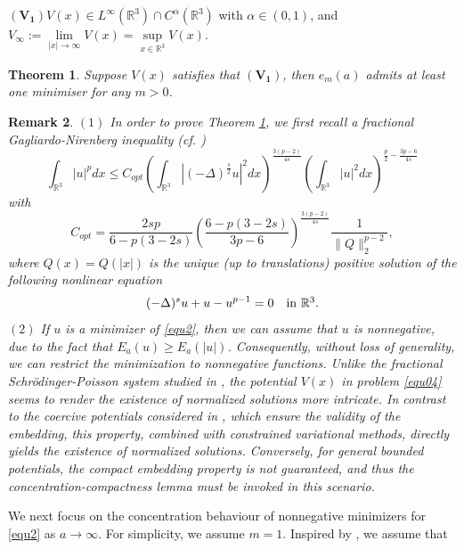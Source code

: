 \documentclass[reqno, 11pt]{amsart} %
\numberwithin{equation}{section}
\newtheorem{theorem}{Theorem}[section]
\newtheorem{remark}[theorem]{Remark}
\begin{document}
$\mathbf{(V_1)}$\quad $V(x)\in L^{\infty}(\mathbb{R}^{3})\cap C^{\alpha}(\mathbb{R}^{3})$ with $\alpha\in (0, 1)$, and $V_{\infty}:=\lim\limits_{|x|\rightarrow\infty}V(x)=\sup\limits_{x \in \mathbb{R}^3}V(x)$.
	\begin{theorem}\label{the1}
		Suppose $V(x)$ satisfies that $\mathbf{(V_1)}$,
	then $e_{m}(a)$ admits at least one minimiser for any $m>0$.
	\end{theorem}
	\begin{remark}
	\rm $(1)$ In order to prove Theorem \ref{the1}, we first recall a fractional Gagliardo-Nirenberg inequality (cf. \cite[Lemma 2.1]{H})
	\begin{equation}\label{equ4}
		\int_{\mathbb{R}^{3}}|u|^{p}dx\leq C_{opt}\left(\int_{\mathbb{R}^{3}}|(-\Delta)^{\frac{s}{2}} u|^{2}dx\right)^{\frac{3(p-2)}{4s}}\left(\int_{\mathbb{R}^{3}}|u|^{2}dx\right)^{\frac{p}{2}-\frac{3p-6}{4s}}
	\end{equation}
	with
	\begin{equation*}
		C_{opt}=\frac{2sp}{6-p(3-2s)}\left( \frac{6-p(3-2s)}{3p-6}\right)^{\frac{3(p-2)}{4s}} \frac{1}{\|Q\|_{2}^{p-2}},
	\end{equation*}
	where $Q(x)=Q(|x|)$ is the unique (up to translations) positive solution of the following nonlinear equation
	\begin{equation}\label{equ5}
		(-\Delta)^{s}u+u-u^{p-1}=0 \quad \hbox{in $\mathbb{R}^3$}.
	\end{equation}	
	$(2)$ If $u$ is a minimizer of \eqref{equ2}, then we can assume that $u$ is nonnegative, due to the fact that $E_{a}(u)\geq E_{a}(|u|)$. Consequently, without loss of generality, we can restrict the minimization to nonnegative functions. Unlike the fractional Schr\"{o}dinger-Poisson system studied in \cite{MHCV}, the potential $V(x)$ in problem \eqref{equ04} seems to render the existence of normalized solutions more intricate. In contrast to the coercive potentials considered in \cite{D,GLMP,GSIM,H}, which ensure the validity of the embedding, this property, combined with constrained variational methods, directly yields the existence of normalized solutions. Conversely, for general bounded potentials, the compact embedding property is not guaranteed, and thus the concentration-compactness lemma must be invoked in this scenario.
\end{remark}
	
	We next focus on the concentration behaviour of nonnegative
	minimizers for \eqref{equ2} as $a\rightarrow\infty$. For simplicity, we assume $m=1$. Inspired by \cite{GSIM,LZ}, we assume that \\
	
\end{document}
